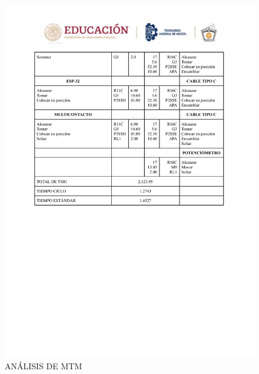     \begin{figure}
        \centering
    \includegraphics[trim = {0mm 100mm 0mm 0mm},clip,scale=0.3]{24/Img/analisisMTM4.pdf}
    \caption{ANÁLISIS DE MTM}
        \label{analisis4}
    \end{figure}
